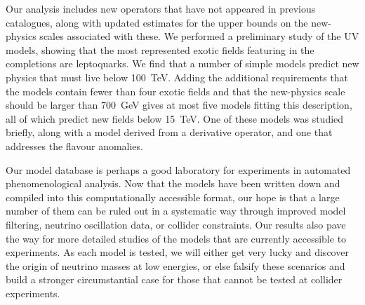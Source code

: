 Our analysis includes new operators that have not appeared in previous
catalogues, along with updated estimates for the upper bounds on the new-physics
scales associated with these. We performed a preliminary study of the UV models,
showing that the most represented exotic fields featuring in the completions are
leptoquarks. We find that a number of simple models predict new physics that
must live below \SI{100}{\TeV}. Adding the additional requirements that the
models contain fewer than four exotic fields and that the new-physics scale
should be larger than \SI{700}{\GeV} gives at most five models fitting this
description, all of which predict new fields below \SI{15}{\TeV}. One of these
models was studied briefly, along with a model derived from a derivative
operator, and one that addresses the flavour anomalies.

Our model database is perhaps a good laboratory for experiments in automated
phenomenological analysis. Now that the models have been written down and
compiled into this computationally accessible format, our hope is that a large
number of them can be ruled out in a systematic way through improved model
filtering, neutrino oscillation data, or collider constraints. Our results also
pave the way for more detailed studies of the models that are currently
accessible to experiments. As each model is tested, we will either get very
lucky and discover the origin of neutrino masses at low energies, or else
falsify these scenarios and build a stronger circumstantial case for those that
cannot be tested at collider experiments.
